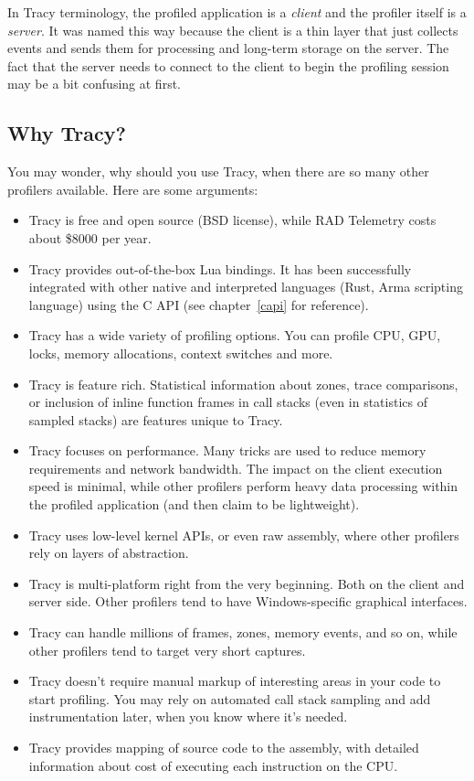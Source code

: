 \documentclass[hidelinks,titlepage,a4paper]{article}
\begin{document}
In Tracy terminology, the profiled application is a \emph{client} and the profiler itself is a \emph{server}. It was named this way because the client is a thin layer that just collects events and sends them for processing and long-term storage on the server. The fact that the server needs to connect to the client to begin the profiling session may be a bit confusing at first.

\subsection{Why Tracy?}

You may wonder, why should you use Tracy, when there are so many other profilers available. Here are some arguments:

\begin{itemize}
\item Tracy is free and open source (BSD license), while RAD Telemetry costs about \$8000 per year.
\item Tracy provides out-of-the-box Lua bindings. It has been successfully integrated with other native and interpreted languages (Rust, Arma scripting language) using the C API (see chapter~\ref{capi} for reference).
\item Tracy has a wide variety of profiling options. You can profile CPU, GPU, locks, memory allocations, context switches and more.
\item Tracy is feature rich. Statistical information about zones, trace comparisons, or inclusion of inline function frames in call stacks (even in statistics of sampled stacks) are features unique to Tracy.
\item Tracy focuses on performance. Many tricks are used to reduce memory requirements and network bandwidth. The impact on the client execution speed is minimal, while other profilers perform heavy data processing within the profiled application (and then claim to be lightweight).
\item Tracy uses low-level kernel APIs, or even raw assembly, where other profilers rely on layers of abstraction.
\item Tracy is multi-platform right from the very beginning. Both on the client and server side. Other profilers tend to have Windows-specific graphical interfaces.
\item Tracy can handle millions of frames, zones, memory events, and so on, while other profilers tend to target very short captures.
\item Tracy doesn't require manual markup of interesting areas in your code to start profiling. You may rely on automated call stack sampling and add instrumentation later, when you know where it's needed.
\item Tracy provides mapping of source code to the assembly, with detailed information about cost of executing each instruction on the CPU.
\end{itemize}
\end{document}
